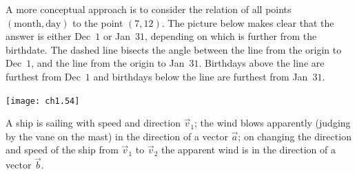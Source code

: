 \begin{exercises}
\begin{answer}
\begin{exparts}
          A more conceptual approach is to consider the relation of all points 
          $(\text{month},\text{day})$ to the point $(7,12)$.
          The picture below
          makes clear that the answer is either Dec~$1$ or Jan~$31$, depending
          on which is further from the birthdate. 
          The dashed line bisects the angle between the line from the
          origin to Dec~$1$, and the line from the origin to Jan~$31$.
          Birthdays above the line are furthest from Dec~$1$ and 
          birthdays below the line are furthest from Jan~$31$.
          \begin{center}
            \texttt{[image: ch1.54]}
          \end{center}
      \end{exparts}
    \end{answer}
  \puzzle \item 
    \cite{Monthly33p118}
    A ship is sailing with speed and direction \( \vec{v}_1 \); the wind blows
    apparently (judging by the vane on the mast) in the direction of a vector
    \( \vec{a} \); on changing the direction and speed of the ship from
    \( \vec{v}_1 \) to \( \vec{v}_2 \) the apparent wind is in the direction
    of a vector \( \vec{b} \).


\end{exercises}
